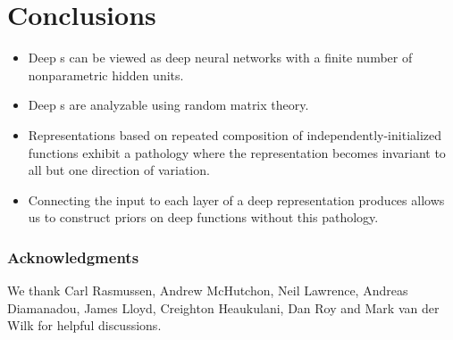 \documentclass{article}
\begin{document}


\section{Conclusions}

\begin{itemize}
\item Deep \gp{}s can be viewed as deep neural networks with a finite number of nonparametric hidden units.
\item Deep \gp{}s are analyzable using random matrix theory.
\item Representations based on repeated composition of independently-initialized functions exhibit a pathology where the representation becomes invariant to all but one direction of variation.
\item Connecting the input to each layer of a deep representation produces allows us to construct priors on deep functions without this pathology.
\end{itemize}


\subsubsection*{Acknowledgments}

We thank Carl Rasmussen, Andrew McHutchon, Neil Lawrence, Andreas Diamanadou, James Lloyd, Creighton Heaukulani, Dan Roy and Mark van der Wilk for helpful discussions.



\end{document}
